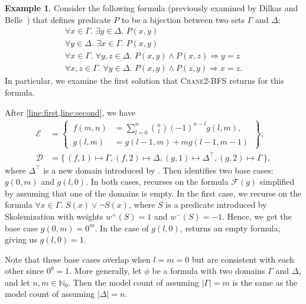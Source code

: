 \documentclass{article}
\theoremstyle{definition}
\newtheorem{example}{Example}
\theoremstyle{remark}
\newcommand{\Cranebfs}{\textsc{Crane2-BFS}}
\begin{document}
\begin{example}\label{example:overall}
  Consider the following formula (previously examined by Dilkas and
  Belle~) that defines predicate $P$ to be a
  bijection between two sets $\Gamma$ and $\Delta$:
  \[
    \begin{gathered}
      \forall x \in \Gamma\text{. }\exists y \in \Delta\text{. }P(x, y)\\
      \forall y \in \Delta\text{. }\exists x \in \Gamma\text{. }P(x, y)\\
      \forall x \in \Gamma\text{. }\forall y, z \in \Delta\text{. }P(x, y) \land P(x, z) \Rightarrow y = z\\
      \forall x, z \in \Gamma\text{. }\forall y \in \Delta\text{. }P(x, y) \land P(z, y) \Rightarrow x = z.
    \end{gathered}
  \]
  In particular, we examine the first solution that \Cranebfs{} returns for this
  formula.

  After \cref{line:first,line:second}, we have
  \begin{align*}
    \mathcal{E} &= \left\{\,\begin{aligned}f(m, n) &= \sum_{l=0}^{n} \binom{n}{l}{(-1)}^{n-l}g(l, m),\\ g(l, m) &= g(l-1, m) + mg(l-1, m-1)\end{aligned}\,\right\};\\
    \mathcal{D} &= \{\, (f, 1) \mapsto \Gamma, (f, 2) \mapsto \Delta, (g, 1) \mapsto \Delta^{\top}, (g, 2) \mapsto \Gamma \,\},
  \end{align*}
  where $\Delta^{\top}$ is a new domain introduced by \Crane. Then
  \FindBaseCases identifies two base cases: $g(0, m)$ and $g(l, 0)$. In both
  cases, \CompileWithBaseCases recurses on the formula $\mathcal{F}(g)$
  simplified by assuming that one of the domains is empty. In the first case, we
  recurse on the formula $\forall x \in \Gamma\text{. }S(x) \lor \neg S(x)$,
  where $S$ is a predicate introduced by Skolemization with weights
  $w^{+}(S) = 1$ and $w^{-}(S) = -1$. Hence, we get the base case
  $g(0, m) = 0^{m}$. In the case of $g(l, 0)$, 
  returns an empty formula, giving us $g(l, 0) = 1$.
\end{example}

Note that these base cases overlap when $l = m = 0$ but are consistent with each
other since $0^{0} = 1$. More generally, let $\phi$ be a formula with two
domains $\Gamma$ and $\Delta$, and let $n, m \in \mathbb{N}_{0}$. Then the model
count of  assuming $|\Gamma| = m$ is the same
as the model count of  assuming $|\Delta| = n$.
\end{document}
